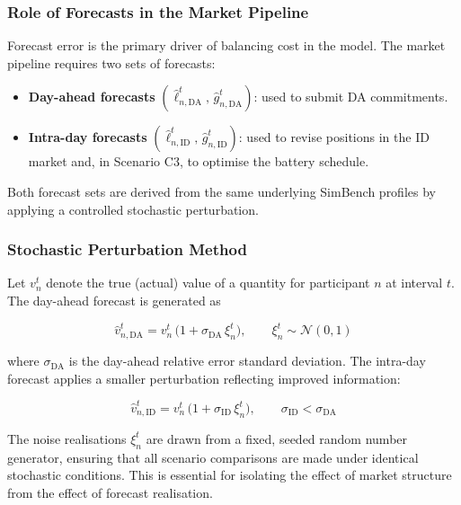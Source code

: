 \documentclass[12pt,a4paper]{article}
\begin{document}
\subsubsection{Role of Forecasts in the Market Pipeline}

Forecast error is the primary driver of balancing cost in the model.  The
market pipeline requires two sets of forecasts:

\begin{itemize}
  \item \textbf{Day-ahead forecasts}
        $(\hat{\ell}_{n,\mathrm{DA}}^{t},\, \hat{g}_{n,\mathrm{DA}}^{t})$:
        used to submit DA commitments.
  \item \textbf{Intra-day forecasts}
        $(\hat{\ell}_{n,\mathrm{ID}}^{t},\, \hat{g}_{n,\mathrm{ID}}^{t})$:
        used to revise positions in the ID market and, in Scenario C3, to
        optimise the battery schedule.
\end{itemize}

Both forecast sets are derived from the same underlying SimBench profiles by
applying a controlled stochastic perturbation.

\subsubsection{Stochastic Perturbation Method}

Let $v_{n}^{t}$ denote the true (actual) value of a quantity for participant
$n$ at interval $t$.  The day-ahead forecast is generated as

\begin{equation}
\hat{v}_{n,\mathrm{DA}}^{t}
  = v_{n}^{t}\,\bigl(1 + \sigma_{\mathrm{DA}}\,\xi_{n}^{t}\bigr),
  \qquad \xi_{n}^{t} \sim \mathcal{N}(0,1)
\label{eq:da_forecast}
\end{equation}

where $\sigma_{\mathrm{DA}}$ is the day-ahead relative error standard
deviation.  The intra-day forecast applies a smaller perturbation reflecting
improved information:

\begin{equation}
\hat{v}_{n,\mathrm{ID}}^{t}
  = v_{n}^{t}\,\bigl(1 + \sigma_{\mathrm{ID}}\,\xi_{n}^{t}\bigr),
  \qquad \sigma_{\mathrm{ID}} < \sigma_{\mathrm{DA}}
\label{eq:id_forecast}
\end{equation}

The noise realisations $\xi_{n}^{t}$ are drawn from a fixed, seeded random
number generator, ensuring that all scenario comparisons are made under
identical stochastic conditions.  This is essential for isolating the effect
of market structure from the effect of forecast realisation.
\end{document}
